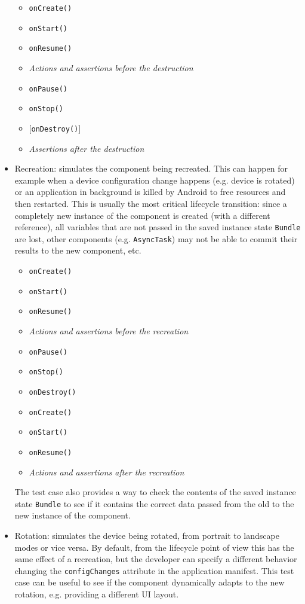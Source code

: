\documentclass[11pt,a4paper,notitlepage]{article}
\begin{document}
\begin{itemize}
	\begin{itemize}
		\item \texttt{onCreate()}
		\item \texttt{onStart()}
		\item \texttt{onResume()}
     	\item \textit{Actions and assertions before the destruction}
		\item \texttt{onPause()}
		\item \texttt{onStop()}
		\item $[$\texttt{onDestroy()}$]$
     	\item \textit{Assertions after the destruction}
	\end{itemize}
	\item Recreation: simulates the component being recreated. This can happen for example when a device configuration change happens (e.g. device is rotated) or an application in background is killed by Android to free resources and then restarted. This is usually the most critical lifecycle transition: since a completely new instance of the component is created (with a different reference), all variables that are not passed in the saved instance state \texttt{Bundle} are lost, other components (e.g. \texttt{AsyncTask}) may not be able to commit their results to the new component, etc.  
	\begin{itemize}
		\item \texttt{onCreate()}
		\item \texttt{onStart()}
		\item \texttt{onResume()}
     	\item \textit{Actions and assertions before the recreation}
		\item \texttt{onPause()}
		\item \texttt{onStop()}
		\item \texttt{onDestroy()}
		\item \texttt{onCreate()}
		\item \texttt{onStart()}
		\item \texttt{onResume()}
     	\item \textit{Actions and assertions after the recreation}
	\end{itemize}
	The test case also provides a way to check the contents of the saved instance state \texttt{Bundle} to see if it contains the correct data passed from the old to the new instance of the component.
	\item Rotation: simulates the device being rotated, from portrait to landscape modes or vice versa. By default, from the lifecycle point of view this has the same effect of a recreation, but the developer can specify a different behavior changing the \texttt{configChanges} attribute in the application manifest. This test case can be useful to see if the component dynamically adapts to the new rotation, e.g. providing a different UI layout.

\end{itemize}
\end{document}

